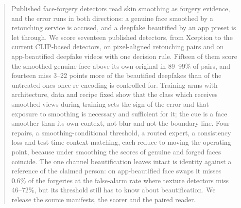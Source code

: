 \documentclass[conference]{IEEEtran}
\begin{document}
\begin{abstract}
Published face-forgery detectors read skin smoothing as forgery evidence, and the error runs in both directions: a genuine
face smoothed by a retouching service is accused, and a deepfake beautified by an app preset is let through. We score seventeen
published detectors, from Xception to the current CLIP-based detectors, on pixel-aligned retouching pairs and on
app-beautified deepfake videos with one decision rule. Fifteen of them score the smoothed genuine face above its own original
in 89--99\% of pairs,
and fourteen miss 3--22 points more of the beautified deepfakes than of the untreated ones once re-encoding is controlled for.
Training arms with architecture, data and recipe fixed show that the class which receives smoothed views during training
sets the sign of the error and that exposure to smoothing is necessary and sufficient for it; the cue is a face smoother than
its own context, not blur and not the boundary line. Four repairs, a smoothing-conditional threshold, a routed expert, a
consistency loss and test-time context matching, each reduce to moving the operating point, because under smoothing the
scores of genuine and forged faces coincide. The one channel beautification leaves intact is identity against a reference of
the claimed person: on app-beautified face swaps it misses 0.6\% of the forgeries at the false-alarm rate where texture
detectors miss 46--72\%,
but its threshold still has to know about beautification. We release the source manifests, the scorer and the paired reader.
\end{abstract}

\end{document}

